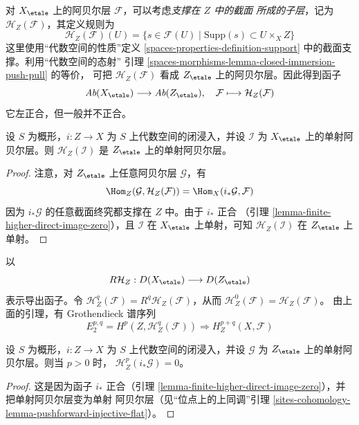 \medskip\noindent
对 $X_\etale$ 上的阿贝尔层 $\mathcal{F}$，可以考虑{\it 支撑在 $Z$ 中的截面
所成的子层}，记为 $\mathcal{H}_Z(\mathcal{F})$，其定义规则为
$$
\mathcal{H}_Z(\mathcal{F})(U) =
\{s \in \mathcal{F}(U) \mid \text{Supp}(s) \subset U \times_X Z\}
$$
这里使用“代数空间的性质”定义
\ref{spaces-properties-definition-support} 中的截面支撑。利用“代数空间的态射”
引理 \ref{spaces-morphisms-lemma-closed-immersion-push-pull} 的等价，
可把 $\mathcal{H}_Z(\mathcal{F})$ 看成 $Z_\etale$ 上的阿贝尔层。因此得到函子
$$
\textit{Ab}(X_\etale) \longrightarrow \textit{Ab}(Z_\etale),\quad
\mathcal{F} \longmapsto \mathcal{H}_Z(\mathcal{F})
$$
它左正合，但一般并不正合。

\begin{lemma}
\label{lemma-sections-with-support-acyclic}
设 $S$ 为概形，$i : Z \to X$ 为 $S$ 上代数空间的闭浸入，并设
$\mathcal{I}$ 为 $X_\etale$ 上的单射阿贝尔层。则
$\mathcal{H}_Z(\mathcal{I})$ 是 $Z_\etale$ 上的单射阿贝尔层。
\end{lemma}

\begin{proof}
注意，对 $Z_\etale$ 上任意阿贝尔层 $\mathcal{G}$，有
$$
\Hom_Z(\mathcal{G}, \mathcal{H}_Z(\mathcal{F})) =
\Hom_X(i_*\mathcal{G}, \mathcal{F})
$$
因为 $i_*\mathcal{G}$ 的任意截面终究都支撑在 $Z$ 中。由于 $i_*$ 正合
（引理 \ref{lemma-finite-higher-direct-image-zero}），且 $\mathcal{I}$ 在
$X_\etale$ 上单射，可知 $\mathcal{H}_Z(\mathcal{I})$ 在 $Z_\etale$ 上单射。
\end{proof}

\noindent
以
$$
R\mathcal{H}_Z : D(X_\etale) \longrightarrow D(Z_\etale)
$$
表示导出函子。令
$\mathcal{H}^q_Z(\mathcal{F}) = R^q\mathcal{H}_Z(\mathcal{F})$，从而
$\mathcal{H}^0_Z(\mathcal{F}) = \mathcal{H}_Z(\mathcal{F})$。
由上面的引理，有 Grothendieck 谱序列
$$
E_2^{p, q} = H^p(Z, \mathcal{H}^q_Z(\mathcal{F}))
\Rightarrow H^{p + q}_Z(X, \mathcal{F})
$$

\begin{lemma}
\label{lemma-cohomology-with-support-sheaf-on-support}
设 $S$ 为概形，$i : Z \to X$ 为 $S$ 上代数空间的闭浸入，并设
$\mathcal{G}$ 为 $Z_\etale$ 上的单射阿贝尔层。则当 $p > 0$ 时，
$\mathcal{H}^p_Z(i_*\mathcal{G}) = 0$。
\end{lemma}

\begin{proof}
这是因为函子 $i_*$ 正合（引理
\ref{lemma-finite-higher-direct-image-zero}），并把单射阿贝尔层变为单射
阿贝尔层（见“位点上的上同调”引理
\ref{sites-cohomology-lemma-pushforward-injective-flat}）。
\end{proof}

